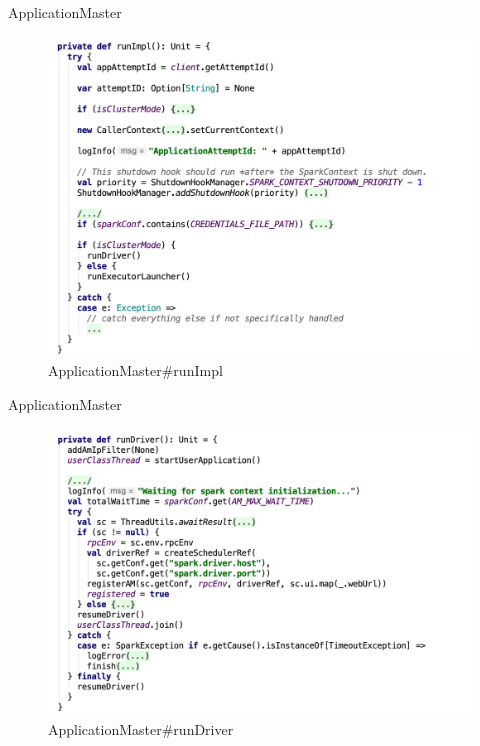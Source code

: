 \begin{frame}[plain,t]{ApplicationMaster} %
	 \\  \vspace{2ex}
	\begin{figure}
		\centering
		\includegraphics[width=0.8\linewidth]{images/app003}
		\caption{ApplicationMaster\#runImpl}
		\label{fig:app003}
	\end{figure}
	
	
\end{frame}
\begin{frame}[plain,t]{ApplicationMaster} %
	 \\  
	\begin{figure}
		\centering
		\includegraphics[width=0.9\linewidth]{images/app005}
		\caption{ApplicationMaster\#runDriver}
		\label{fig:app005}
	\end{figure}
	
\end{frame}
